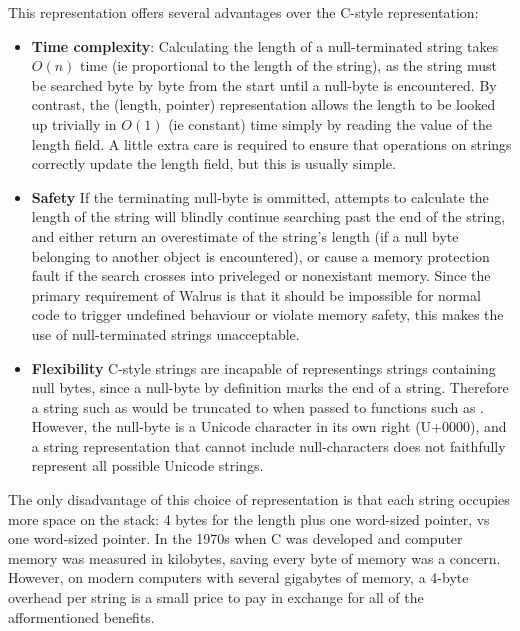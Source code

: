 This representation offers several advantages over the C-style representation:
\begin{itemize}
    \item \textbf{Time complexity}: Calculating the length of a null-terminated string takes $O(n)$ time (ie proportional to the length of the string),
          as the string must be searched byte by byte from the start until a null-byte is encountered.
          By contrast, the (length, pointer) representation allows the length to be looked up trivially in $O(1)$ (ie constant) time simply by reading the value of the
          length field. A little extra care is required to ensure that operations on strings correctly update the length field, but this is usually simple.
    \item \textbf{Safety} If the terminating null-byte is ommitted, attempts to calculate the length of the string will blindly continue searching past the end of the string,
          and either return an overestimate of the string's length (if a null byte belonging to another object is encountered), or cause a memory protection fault if the search
          crosses into priveleged or nonexistant memory. Since the primary requirement of Walrus is that it should be impossible for normal code to trigger undefined behaviour
          or violate memory safety, this makes the use of null-terminated strings unacceptable.
    \item \textbf{Flexibility} C-style strings are incapable of representings strings containing null bytes, since a null-byte by definition marks the end of a string.
          Therefore a string such as  would be truncated to  when passed to functions such as . However, the null-byte is
          a Unicode character in its own right (U+0000), and a string representation that cannot include null-characters does not faithfully represent all possible Unicode
          strings.
\end{itemize}

The only disadvantage of this choice of representation is that each string occupies more space on the stack:
4 bytes for the length plus one word-sized pointer, vs one word-sized pointer. In the 1970s when C was developed
and computer memory was measured in kilobytes, saving every byte of memory was a concern. However, on modern computers
with several gigabytes of memory, a 4-byte overhead per string is a small price to pay in exchange for all of the afformentioned benefits.

